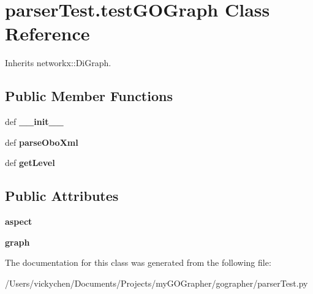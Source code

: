 \hypertarget{classparser_test_1_1test_g_o_graph}{
\section{parserTest.testGOGraph Class Reference}
\label{classparser_test_1_1test_g_o_graph}
}


Inherits networkx::DiGraph.

\subsection*{Public Member Functions}
\begin{DoxyCompactItemize}
\item 
\hypertarget{classparser_test_1_1test_g_o_graph_af91a178d37bd1db3dfeaf4e500426b0c}{
def {\bfseries \_\-\_\-init\_\-\_\-}}
\label{classparser_test_1_1test_g_o_graph_af91a178d37bd1db3dfeaf4e500426b0c}

\item 
\hypertarget{classparser_test_1_1test_g_o_graph_af0982fd7e2c63ce8f0e5d97d2d14d16d}{
def {\bfseries parseOboXml}}
\label{classparser_test_1_1test_g_o_graph_af0982fd7e2c63ce8f0e5d97d2d14d16d}

\item 
\hypertarget{classparser_test_1_1test_g_o_graph_a782852fc044545b8ad591ce34987d956}{
def {\bfseries getLevel}}
\label{classparser_test_1_1test_g_o_graph_a782852fc044545b8ad591ce34987d956}

\end{DoxyCompactItemize}
\subsection*{Public Attributes}
\begin{DoxyCompactItemize}
\item 
\hypertarget{classparser_test_1_1test_g_o_graph_a3733a7689ecb5dbfe7bc59026c2adebd}{
{\bfseries aspect}}
\label{classparser_test_1_1test_g_o_graph_a3733a7689ecb5dbfe7bc59026c2adebd}

\item 
\hypertarget{classparser_test_1_1test_g_o_graph_a3f64bb6d5fedd7c78c2b1b8b9c3f8ac1}{
{\bfseries graph}}
\label{classparser_test_1_1test_g_o_graph_a3f64bb6d5fedd7c78c2b1b8b9c3f8ac1}

\end{DoxyCompactItemize}


The documentation for this class was generated from the following file:\begin{DoxyCompactItemize}
\item 
/Users/vickychen/Documents/Projects/myGOGrapher/gographer/parserTest.py\end{DoxyCompactItemize}
